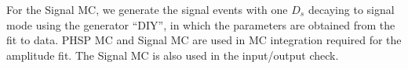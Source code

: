 

For the Signal MC, we generate the signal events with one $D_{s}$ decaying to signal mode using the generator ``DIY'', in which the parameters are obtained from the fit to data. PHSP MC and Signal MC are used in MC integration required for the amplitude fit. The Signal MC is also used in the input/output check.



